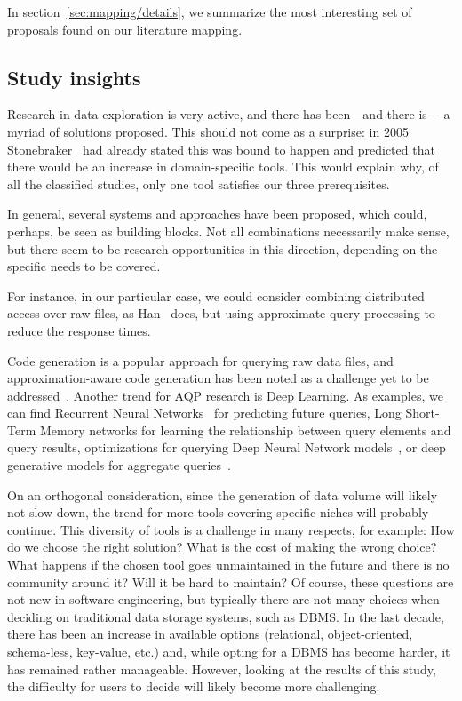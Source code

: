 In section~\ref{sec:mapping/details}, we summarize the most interesting set of
proposals found on our literature mapping.

\subsection{Study insights}
\label{sec:mapping/insights}
Research in data exploration is very active, and there has been---and there is---
a myriad of solutions proposed. This should not come as a surprise:
in 2005 Stonebraker~\cite{Stonebraker2005} had already stated this was bound to
happen and predicted that there would be an increase in domain-specific tools.
This would explain why, of all the classified studies, only one tool satisfies our
three prerequisites.

In general, several systems and approaches have been proposed, which could,
perhaps, be seen as building blocks. Not all combinations necessarily make sense,
but there seem to be research opportunities in this direction, depending
on the specific needs to be covered.

For instance, in our particular case, we could consider combining distributed
access over raw files, as Han~\cite{Han2017} does, but using approximate query
processing to reduce the response times.

Code generation is a popular approach for querying raw data files, and \linebreak
approximation-aware code generation has been noted as a challenge
yet to be addressed~\cite{Mozafari2017AQP}. Another trend
for \gls{AQP} research is Deep Learning. As examples, we can find
Recurrent Neural Networks~\cite{10020614,10.1145/3442338} for predicting future queries,
Long Short-Term Memory networks for learning the relationship between query elements
and query results, optimizations for querying Deep Neural Network models~\cite{10.14778/3476249.3476285},
or deep generative models for aggregate queries~\cite{9101822}.

On an orthogonal consideration, since the generation of data volume will likely
not slow down, the trend for more tools covering specific
niches will probably continue. This diversity of tools is a
challenge in many respects, for example: How do we choose the right solution? What is
the cost of making the wrong choice? What happens if the chosen tool goes
unmaintained in the future and there is no community around it? Will it
be hard to maintain? Of course, these questions are not new in software
engineering, but typically there are not many choices when deciding
on traditional data storage systems, such as \gls{DBMS}.
In the last decade, there has been an increase in available options
(relational, object-oriented, schema-less, key-value, etc.) and, while opting
for a \gls{DBMS} has become harder, it has remained rather manageable. However, looking at the
results of this study, the difficulty for users to decide will likely become
more challenging.


